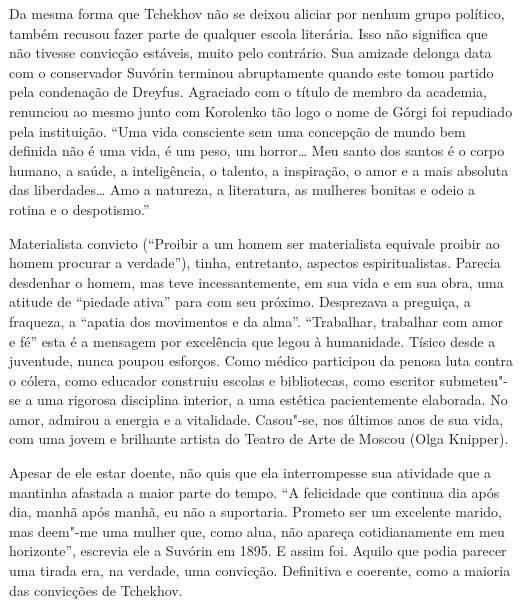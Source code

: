 Da mesma forma que Tchekhov não se deixou aliciar por nenhum grupo
político, também recusou fazer parte de qualquer escola literária. Isso
não significa que não tivesse convicção estáveis, muito pelo contrário.
Sua amizade delonga data com o conservador Suvórin terminou abruptamente
quando este tomou partido pela condenação de Dreyfus. Agraciado com o
título de membro da academia, renunciou ao mesmo junto com Korolenko tão
logo o nome de Górgi foi repudiado pela instituição. ``Uma vida
consciente sem uma concepção de mundo bem definida não é uma vida, é um
peso, um horror\ldots{} Meu santo dos santos é o corpo humano, a saúde, a
inteligência, o talento, a inspiração, o amor e a mais absoluta das
liberdades\ldots{} Amo a natureza, a literatura, as mulheres bonitas e odeio
a rotina e o despotismo.''

Materialista convicto (``Proibir a um homem ser materialista equivale
proibir ao homem procurar a verdade''), tinha, entretanto, aspectos
espiritualistas. Parecia desdenhar o homem, mas teve incessantemente, em
sua vida e em sua obra, uma atitude de ``piedade ativa'' para com seu
próximo. Desprezava a preguiça, a fraqueza, a ``apatia dos movimentos e
da alma''. ``Trabalhar, trabalhar com amor e fé'' esta é a mensagem por
excelência que legou à humanidade. Tísico desde a juventude, nunca
poupou esforços. Como médico participou da penosa luta contra o cólera,
como educador construiu escolas e bibliotecas, como escritor submeteu"-se
a uma rigorosa disciplina interior, a uma estética pacientemente
elaborada. No amor, admirou a energia e a vitalidade. Casou"-se, nos
últimos anos de sua vida, com uma jovem e brilhante artista do Teatro de
Arte de Moscou (Olga Knipper).

Apesar de ele estar doente, não quis que ela interrompesse sua atividade
que a mantinha afastada a maior parte do tempo. ``A felicidade que
continua dia após dia, manhã após manhã, eu não a suportaria. Prometo
ser um excelente marido, mas deem"-me uma mulher que, como alua, não
apareça cotidianamente em meu horizonte'', escrevia ele a Suvórin em
1895. E assim foi. Aquilo que podia parecer uma tirada era, na verdade,
uma convicção. Definitiva e coerente, como a maioria das convicções de
Tchekhov.


